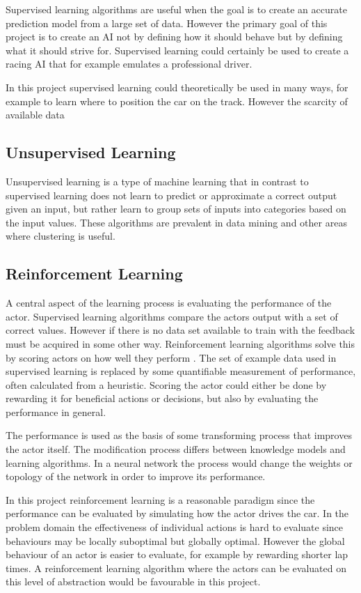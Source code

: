 Supervised learning algorithms are useful when the goal is to create an accurate prediction model from a large set of data. However the primary goal of this project is to create an AI not by defining how it should behave but by defining what it should strive for. Supervised learning could certainly be used to create a racing AI that for example emulates a professional driver. 

In this project supervised learning could theoretically be used in many ways, for example to learn where to position the car on the track. However the scarcity of available data 

\subsection{Unsupervised Learning}
Unsupervised learning is a type of machine learning that in contrast to supervised learning does not learn to predict or approximate a correct output given an input, but rather learn to group sets of inputs into categories based on the input values. These algorithms are prevalent in data mining and other areas where clustering is useful. 


\subsection{Reinforcement Learning}
A central aspect of the learning process is evaluating the performance of the actor. Supervised learning algorithms compare the actors output with a set of correct values. However if there is no data set available to train with the feedback must be acquired in some other way. Reinforcement learning algorithms solve this by scoring actors on how well they perform \cite{whiteson}. The set of example data used in supervised learning is replaced by some quantifiable measurement of performance, often calculated from a heuristic. Scoring the actor could either be done by rewarding it for beneficial actions or decisions, but also by evaluating the performance in general. 

The performance is used as the basis of some transforming process that improves the actor itself. The modification process differs between knowledge models and learning algorithms. In a neural network the process would change the weights or topology of the network in order to improve its performance.

In this project reinforcement learning is a reasonable paradigm since the performance can be evaluated by simulating how the actor drives the car. In the problem domain the effectiveness of individual actions is hard to evaluate since behaviours may be locally suboptimal but globally optimal. However the global behaviour of an actor is easier to evaluate, for example by rewarding shorter lap times. A reinforcement learning algorithm where the actors can be evaluated on this level of abstraction would be favourable in this project.   

